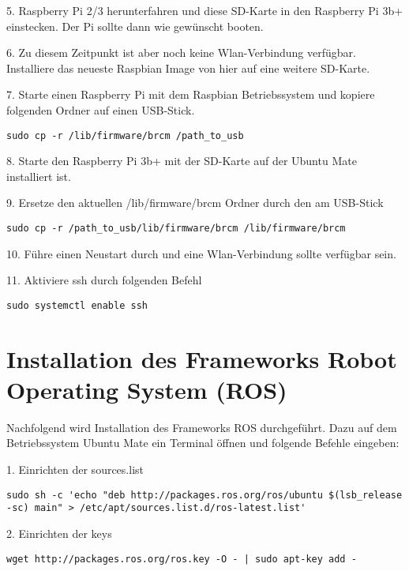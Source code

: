 5. Raspberry Pi 2/3 herunterfahren und diese SD-Karte in den Raspberry Pi 3b+ einstecken. Der Pi sollte dann wie gewünscht booten. 

6. Zu diesem Zeitpunkt ist aber noch keine Wlan-Verbindung verfügbar. Installiere das neueste Raspbian Image von hier auf eine weitere SD-Karte. 

7. Starte einen Raspberry Pi mit dem Raspbian Betriebssystem und kopiere folgenden Ordner auf einen USB-Stick. 

\begin{lstlisting}
sudo cp -r /lib/firmware/brcm /path_to_usb
\end{lstlisting}

8. Starte den Raspberry Pi 3b+ mit der SD-Karte auf der Ubuntu Mate installiert ist. 

9. Ersetze den aktuellen /lib/firmware/brcm Ordner durch den am USB-Stick

\begin{lstlisting}
sudo cp -r /path_to_usb/lib/firmware/brcm /lib/firmware/brcm
\end{lstlisting}

10. Führe einen Neustart durch und eine Wlan-Verbindung sollte verfügbar sein.

11. Aktiviere ssh durch folgenden Befehl

\begin{lstlisting}
sudo systemctl enable ssh
\end{lstlisting}


\section{Installation des Frameworks Robot Operating System (ROS)}

Nachfolgend wird Installation des Frameworks ROS durchgeführt. Dazu auf dem Betriebssystem Ubuntu Mate ein Terminal öffnen und folgende Befehle eingeben:

1. Einrichten der sources.list

\begin{lstlisting}
sudo sh -c 'echo "deb http://packages.ros.org/ros/ubuntu $(lsb_release -sc) main" > /etc/apt/sources.list.d/ros-latest.list'
\end{lstlisting}

2. Einrichten der keys

\begin{lstlisting}
wget http://packages.ros.org/ros.key -O - | sudo apt-key add -
\end{lstlisting}

